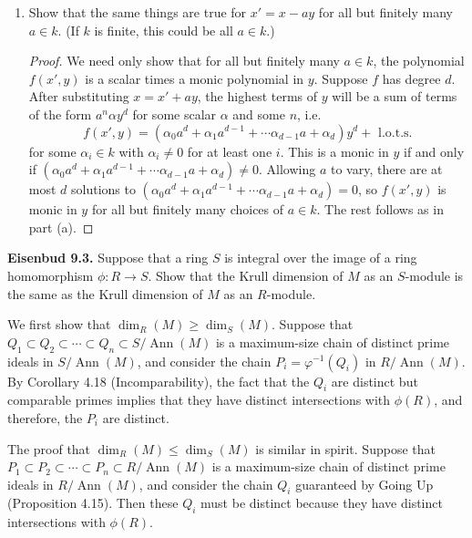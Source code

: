 \documentclass[Letter,12pt]{article}
\newcommand{\problem}[2]{
	\vspace{0.3in}
	\begin{leftbar}
		\noindent \textbf{{#1}.} {#2}
\end{leftbar} }
\renewenvironment{leftbar}{%
	\def\FrameCommand{\vrule width 1pt \relax\hspace {5pt}}
	\MakeFramed {\advance \hsize -\width \FrameRestore }
}{
	\endMakeFramed
}
\newcommand{\<}{\left\langle}
\renewcommand{\>}{\right\rangle}
\DeclareMathOperator{\ann}{Ann}
\theoremstyle{definition}
\begin{document}
\begin{enumerate}
\begin{enumerate}
			\item Show that the same things are true for $x'=x-ay$ for all but finitely many $a\in k$.  (If $k$ is finite, this could be all $a\in k$.)
			\begin{proof}
				We need only show that for all but finitely many $a\in k$, the polynomial $f(x',y)$ is a scalar times a monic polynomial in $y$.  Suppose $f$ has degree $d$.  After substituting $x=x'+ay$, the highest terms of $y$ will be a sum of terms of the form $a^n\alpha y^d$ for some scalar $\alpha$ and some $n$, i.e.
				$$f(x',y)=(\alpha_0a^d+\alpha_1 a^{d-1}+\cdots \alpha_{d-1}a+\alpha_d)y^d+\text{ l.o.t.s}.$$
				for some $\alpha_i\in k$ with $\alpha_i\neq 0$ for at least one $i$.  This is a monic in $y$ if and only if $(\alpha_0a^d+\alpha_1 a^{d-1}+\cdots \alpha_{d-1}a+\alpha_d)\neq 0$.  Allowing $a$ to vary, there are at most $d$ solutions to $(\alpha_0a^d+\alpha_1 a^{d-1}+\cdots \alpha_{d-1}a+\alpha_d)= 0$, so $f(x',y)$ is monic in $y$ for all but finitely many choices of $a\in k$.  The rest follows as in part (a).
			\end{proof}
		\end{enumerate}
	\end{enumerate}
	
	
	\problem{Eisenbud 9.3}{
		Suppose that a ring $S$ is integral over the image of a ring homomorphism $\phi:R\to S$. Show that the Krull dimension of $M$ as an $S$-module is the same as the Krull dimension of $M$ as an $R$-module.
	}
	
	We first show that $\dim_{R}(M) \geq \dim_{S}(M)$. Suppose that $Q_1\subset Q_2\subset\cdots \subset Q_n\subset S/\ann(M)$ is a maximum-size chain of distinct prime ideals in $S/\ann(M)$, and consider the chain $P_i=\varphi^{-1}(Q_i)$ in $R/\ann(M)$. By Corollary 4.18 (Incomparability), the fact that the $Q_i$ are distinct but comparable primes implies that they have distinct intersections with $\phi(R)$, and therefore, the $P_i$ are distinct.
	
	The proof that $\dim_{R}(M) \leq \dim_{S}(M)$ is similar in spirit. Suppose that $P_1\subset P_2\subset\cdots \subset P_n\subset R/\ann(M)$ is a maximum-size chain of distinct prime ideals in $R/\ann(M)$, and consider the chain $Q_i$ guaranteed by Going Up (Proposition 4.15). Then these $Q_i$ must be distinct because they have distinct intersections with $\phi(R)$.
	
\end{document}
